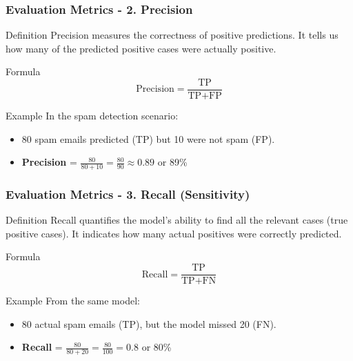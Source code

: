 \documentclass[aspectratio=169]{beamer}
\begin{document}
\begin{frame}[fragile]
    \frametitle{Evaluation Metrics - 2. Precision}
    \begin{block}{Definition}
        Precision measures the correctness of positive predictions. It tells us how many of the predicted positive cases were actually positive.
    \end{block}
    
    \begin{block}{Formula}
        \begin{equation}
        \text{Precision} = \frac{\text{TP}}{\text{TP} + \text{FP}}
        \end{equation}
    \end{block}

    \begin{block}{Example}
        In the spam detection scenario:
        \begin{itemize}
            \item 80 spam emails predicted (TP) but 10 were not spam (FP).
            \item \textbf{Precision} = \( \frac{80}{80 + 10} = \frac{80}{90} \approx 0.89 \) or 89\%
        \end{itemize}
    \end{block}
\end{frame}

\begin{frame}[fragile]
    \frametitle{Evaluation Metrics - 3. Recall (Sensitivity)}
    \begin{block}{Definition}
        Recall quantifies the model’s ability to find all the relevant cases (true positive cases). 
        It indicates how many actual positives were correctly predicted.
    \end{block}

    \begin{block}{Formula}
        \begin{equation}
        \text{Recall} = \frac{\text{TP}}{\text{TP} + \text{FN}}
        \end{equation}
    \end{block}

    \begin{block}{Example}
        From the same model:
        \begin{itemize}
            \item 80 actual spam emails (TP), but the model missed 20 (FN).
            \item \textbf{Recall} = \( \frac{80}{80 + 20} = \frac{80}{100} = 0.8 \) or 80\%
        \end{itemize}
    \end{block}
\end{frame}
\end{document}
